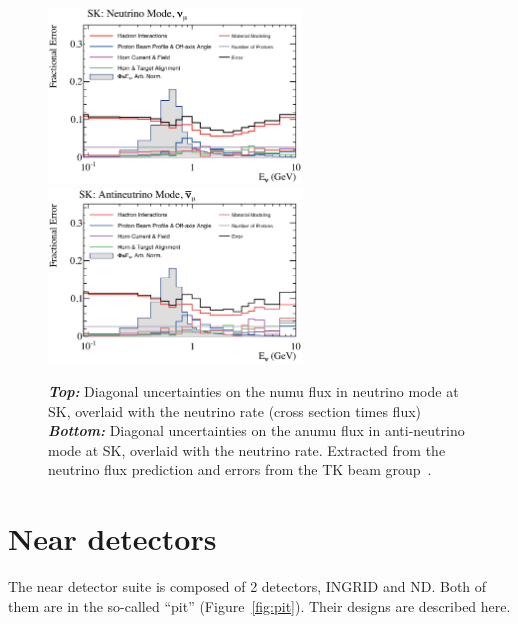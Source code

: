 \begin{figure}[ht!]
  \center
  \includegraphics[width=0.6\textwidth]{images/t2k/SK_numode.eps} \\
  \includegraphics[width=0.6\textwidth]{images/t2k/SK_anumode.eps}
  \caption[Neutrino flux prediction errors in (anti-) neutrino
  mode]{\textbf{\textit{Top:}} Diagonal uncertainties on the
    \gls{numu} flux in neutrino mode at \Gls{SK}, overlaid with the
    neutrino rate (cross section times flux) \textbf{\textit{Bottom:}}
    Diagonal uncertainties on the \gls{anumu} flux in anti-neutrino
    mode at \Gls{SK}, overlaid with the neutrino rate. Extracted from
    the neutrino flux prediction and errors from the \Gls{TK} beam
    group~\cite{TomislavVladisavljevicFluxTuning2017,MarkHartzFluxUncertainty2017}.}
  \label{fig:flux2}
\end{figure}
\clearpage

\section{Near detectors}
\label{sec:neardetectors}
The near detector suite is composed of 2 detectors, \Gls{INGRID} and
\Gls{ND}. Both of them are in the so-called ``pit''
(Figure~\ref{fig:pit}). Their designs are described here.

